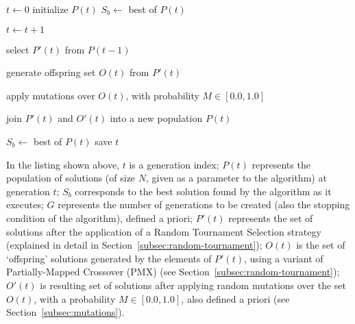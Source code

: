 \begin{algorithmic}[1]

\State $t \leftarrow 0$
\State initialize $P(t)$
\State $S_b \leftarrow$ best of $P(t)$


\State $t \leftarrow t + 1$

\State select $P'(t)$ from $P(t - 1)$

\State generate offspring set $O(t)$ from $P'(t)$

\State apply mutations over $O(t)$, 
\Statex[2] with probability $M \in [0.0, 1.0]$

\State join $P'(t)$ and $O'(t)$ into a new population $P(t)$


    \State $S_b \leftarrow$ best of $P(t)$
    \State save $t$

\EndIf

\EndWhile

\end{algorithmic}\vertbreak

In the listing shown above, $t$ is a generation index; $P(t)$ represents the 
population of solutions (of size $N$, given as a parameter to the algorithm) at 
generation $t$; $S_b$ corresponds to the 
best solution found by the algorithm as it executes; $G$ represents the number of generations 
to be created (also the stopping condition of the algorithm), defined a priori; 
$P'(t)$ represents the set of solutions after the application of a Random 
Tournament Selection strategy (explained in detail in Section~\ref{subsec:random-tournament}); $O(t)$ 
is the set of `offspring' solutions generated by the elements of $P'(t)$, using 
a variant of Partially-Mapped Crossover (PMX) (see Section~\ref{subsec:random-tournament}); $O'(t)$ is 
resulting set of solutions after applying random mutations over the set $O(t)$, 
with a probability $M \in [0.0, 1.0]$, also defined a priori (see Section~\ref{subsec:mutations}).


